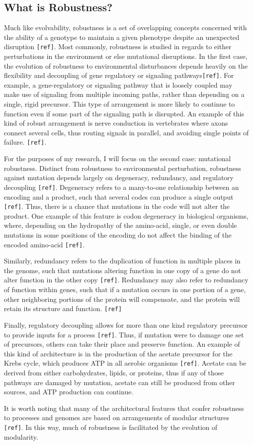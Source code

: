 \subsection{What is Robustness? }

Much like evolvability, robustness is a set of overlapping concepts concerned with the ability of a genotype to maintain a given phenotype despite an unexpected disruption \verb|[ref]|.  Most commonly, robustness is studied in regards to either perturbations in the environment or else mutational disruptions. In the first case, the evolution of robustness to environmental disturbances depends heavily on the flexibility and decoupling of gene regulatory or signaling pathways\verb|[ref]|. For example, a gene-regulatory or signaling pathway that is loosely coupled may make use of signaling from multiple incoming paths, rather than depending on a single, rigid precursor. This type of arrangement is more likely to continue to function even if some part of the signaling path is disrupted. An example of this kind of robust arrangement is nerve conduction in vertebrates where axons connect several cells, thus routing signals in parallel, and avoiding single points of failure. \verb|[ref]|.

For the purposes of my research, I will focus on the second case: mutational robustness. Distinct from robustness to environmental perturbation, robustness against mutation depends largely on degeneracy, redundancy, and regulatory decoupling \verb|[ref]|. Degeneracy refers to a many-to-one relationship between an encoding and a product, such that several codes can produce a single output \verb|[ref]|. Thus, there is a chance that mutations in the code will not alter the product. One example of this feature is codon degeneracy in biological organisms, where, depending on the hydropathy of the amino-acid, single, or even double mutations in some positions of the encoding do not affect the binding of the encoded amino-acid \verb|[ref]|.

Similarly, redundancy refers to the duplication of function in multiple places in the genome, such that mutations altering function in one copy of a gene do not alter function in the other copy \verb|[ref]|. Redundancy may also refer to redundancy of function within genes, such that if a mutation occurs in one portion of a gene, other neighboring portions of the protein will compensate, and the protein will retain its structure and function. \verb|[ref]|

Finally, regulatory decoupling allows for more than one kind regulatory precursor to provide inputs for a process \verb|[ref]|. Thus, if mutation were to damage one set of precursors, others can take their place and preserve function. An example of this kind of architecture is in the production of the acetate precursor for the Krebs cycle, which produces ATP in all aerobic organisms \verb|[ref]|. Acetate can be derived from either carbohydrates, lipids, or proteins, thus if any of those pathways are damaged by mutation, acetate can still be produced from other sources, and ATP production can continue.

It is worth noting that many of the architectural features that confer robustness to processes and genomes are based on arrangements of modular structures \verb|[ref]|. In this way, much of robustness is facilitated by the evolution of modularity.

